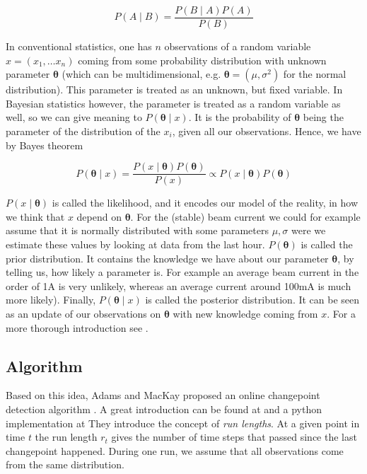 \documentclass[12pt,a4paper]{article}
\begin{document}
\begin{equation*}
P\left(A \mid B\right)=\frac{P\left(B \mid A\right)P\left(A\right)}{P\left(B\right)}
\end{equation*}

In conventional statistics, one has $n$ observations of a random variable $ x = \left(x_1, \dots x_n\right)$ coming from some probability distribution with unknown parameter $\bm{{\theta}}$ (which can be multidimensional, e.g. $\bm{{\theta}}=\left(\mu, \sigma^2 \right)$ for the normal distribution). This parameter is treated as an unknown, but fixed variable. In Bayesian statistics however, the parameter is treated as a random variable as well, so we can give meaning to $P\left(\bm{{\theta}} \mid x\right)$. It is the probability of $\bm{{\theta}}$ being the parameter of the distribution of the $x_i$, given all our observations. Hence, we have by Bayes theorem

\begin{equation} \label{eq:posterior_distribution}
	P\left(\bm {{\theta}} \mid x\right)=\frac{P\left(x \mid \bm{{\theta}}\right)P\left(\bm {{\theta}}\right)}{P\left(x\right)} \propto P\left(x \mid \bm{{\theta}}\right)P\left(\bm {{\theta}}\right)
\end{equation}

$P\left(x \mid \bm{{\theta}}\right)$ is called the likelihood, and it encodes our model of the reality, in how we think that $x$ depend on $\bm{{\theta}}$. For the (stable) beam current we could for example assume that it is normally distributed with some parameters $\mu, \sigma$ were we estimate these values by looking at data from the last hour. $P\left(\bm {{\theta}}\right)$ is called the prior distribution. It contains the knowledge we have about our parameter $\bm{{\theta}}$, by telling us, how likely a parameter is. For example an average beam current in the order of 1A is very unlikely, whereas an average current around 100mA is much more likely).  Finally, $P\left(\bm {{\theta}} \mid x\right)$ is called the posterior distribution. It can be seen as an update of our observations on $\bm{{\theta}}$ with new knowledge coming from $x$. For a more thorough introduction see \cite{Spiegelhalter:Bayesianstatistics,Brooks-Bartlett:Probabilityconceptsexplained}.

\subsection{Algorithm}

Based on this idea, Adams and MacKay proposed an online changepoint detection algorithm \cite{Adams:BayesianOnlineChangepoint}. A great introduction can be found at \cite{Gundersen:BayesianOnlineChangepoint} and a python implementation at \cite{Kulick:bayesianchangepointdetection} They introduce the concept of \textit{run lengths}. At a given point in time $t$ the run length $r_t$ gives the number of time steps that passed since the last changepoint happened. During one run, we assume that all observations come from the same distribution.
\end{document}
